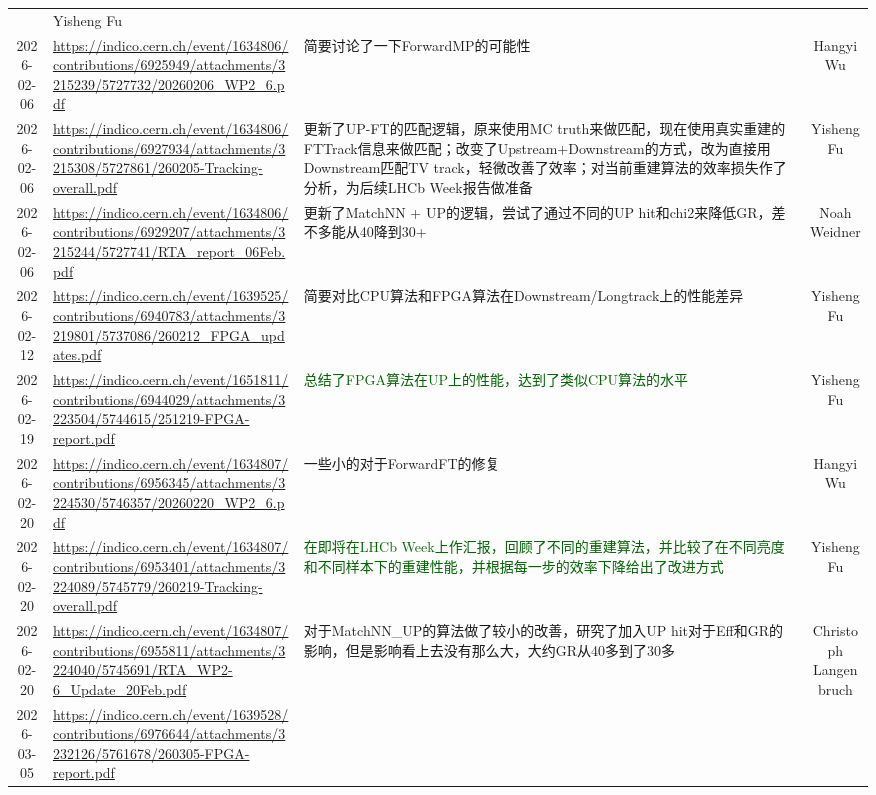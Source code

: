 \documentclass[UTF8]{article}
\newcommand{\green}[1]{\textcolor{darkgreen}{#1}}
\begin{document}
\begin{longtable}{c>{\centering\arraybackslash}m{4cm}m{6cm}c}
        & Yisheng Fu \\
    2026-02-06 & \tiny\url{https://indico.cern.ch/event/1634806/contributions/6925949/attachments/3215239/5727732/20260206_WP2_6.pdf}
        & 简要讨论了一下ForwardMP的可能性
        & Hangyi Wu \\
    2026-02-06 & \tiny\url{https://indico.cern.ch/event/1634806/contributions/6927934/attachments/3215308/5727861/260205-Tracking-overall.pdf}
        & 更新了UP-FT的匹配逻辑，原来使用MC truth来做匹配，现在使用真实重建的FTTrack信息来做匹配；改变了Upstream+Downstream的方式，改为直接用Downstream匹配TV track，轻微改善了效率；对当前重建算法的效率损失作了分析，为后续LHCb Week报告做准备
        & Yisheng Fu \\
    2026-02-06 & \tiny\url{https://indico.cern.ch/event/1634806/contributions/6929207/attachments/3215244/5727741/RTA_report_06Feb.pdf}
        & 更新了MatchNN + UP的逻辑，尝试了通过不同的UP hit和chi2来降低GR，差不多能从40降到30+
        & Noah Weidner \\
    2026-02-12 & \tiny\url{https://indico.cern.ch/event/1639525/contributions/6940783/attachments/3219801/5737086/260212_FPGA_updates.pdf}
        & 简要对比CPU算法和FPGA算法在Downstream/Longtrack上的性能差异
        & Yisheng Fu \\
    2026-02-19 & \tiny\url{https://indico.cern.ch/event/1651811/contributions/6944029/attachments/3223504/5744615/251219-FPGA-report.pdf}
        & \green{总结了FPGA算法在UP上的性能，达到了类似CPU算法的水平}
        & Yisheng Fu \\
    2026-02-20 & \tiny\url{https://indico.cern.ch/event/1634807/contributions/6956345/attachments/3224530/5746357/20260220_WP2_6.pdf}
        & 一些小的对于ForwardFT的修复
        & Hangyi Wu \\
    2026-02-20 & \tiny\url{https://indico.cern.ch/event/1634807/contributions/6953401/attachments/3224089/5745779/260219-Tracking-overall.pdf}
        & \green{在即将在LHCb Week上作汇报，回顾了不同的重建算法，并比较了在不同亮度和不同样本下的重建性能，并根据每一步的效率下降给出了改进方式}
        & Yisheng Fu \\
    2026-02-20 & \tiny\url{https://indico.cern.ch/event/1634807/contributions/6955811/attachments/3224040/5745691/RTA_WP2-6_Update_20Feb.pdf}
        & 对于MatchNN\_UP的算法做了较小的改善，研究了加入UP hit对于Eff和GR的影响，但是影响看上去没有那么大，大约GR从40多到了30多
        & Christoph Langenbruch \\
    2026-03-05 & \tiny\url{https://indico.cern.ch/event/1639528/contributions/6976644/attachments/3232126/5761678/260305-FPGA-report.pdf}

\end{longtable}
\end{document}
